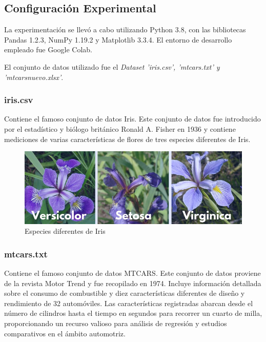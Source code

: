 \documentclass[conference]{IEEEtran}
\begin{document}
    \subsection{Configuraci\'on Experimental}
        La experimentación se llevó a cabo utilizando Python 3.8, con las bibliotecas Pandas 1.2.3, NumPy 1.19.2 y Matplotlib 3.3.4. El entorno de desarrollo empleado fue Google Colab.
        
        El conjunto de datos utilizado fue el \textit{Dataset 'iris.csv', 'mtcars.txt' y 'mtcarsnuevo.xlsx'}.
            
        \subsubsection{iris.csv}
            Contiene el famoso conjunto de datos Iris. Este conjunto de datos fue introducido por el estadístico y biólogo británico Ronald A. Fisher en 1936 y contiene mediciones de varias características de flores de tres especies diferentes de Iris.
            
            \begin{figure}[h]
            	\centering
            	\includegraphics[scale=.22]{Iris.jpg}
            	\caption{Especies diferentes de Iris} 
            \end{figure}
    
        \subsubsection{mtcars.txt}
            Contiene el famoso conjunto de datos MTCARS. Este conjunto de datos proviene de la revista Motor Trend y fue recopilado en 1974. Incluye información detallada sobre el consumo de combustible y diez características diferentes de diseño y rendimiento de 32 automóviles. Las características registradas abarcan desde el número de cilindros hasta el tiempo en segundos para recorrer un cuarto de milla, proporcionando un recurso valioso para análisis de regresión y estudios comparativos en el ámbito automotriz.
        
\end{document}

